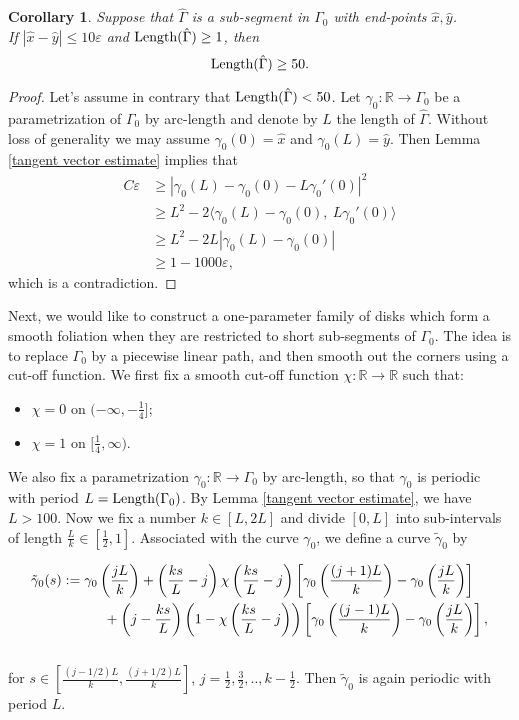 \documentclass[a4paper, reqno]{amsart}
\newtheorem{corollary}[theorem]{Corollary}
\theoremstyle{definition}
\theoremstyle{remark}
\numberwithin{equation}{section}
\newcommand{\Len}{\textup{Length}}
\numberwithin{equation}{section}
\numberwithin{equation}{section}
\begin{document}
\begin{corollary}{\label{large length}}
	Suppose that $\hat{\Gamma}$ is a sub-segment in $\Gamma_0$ with end-points $\hat{x}, \hat{y}$.\\ If $|\hat{x} - \hat{y}|\leq 10\varepsilon$ and $\Len(\hat{\Gamma})\geq 1$, then 
	\[\Len(\hat{\Gamma}) \geq 50.\]  	
\end{corollary}

\begin{proof}
	Let's assume in contrary that $\Len(\hat{\Gamma}) < 50$.  Let $\gamma_0:\mathbb{R}\to\Gamma_0$ be a parametrization of $\Gamma_0$ by arc-length and denote by $L$ the length of $\hat{\Gamma}$. Without loss of generality we may assume $\gamma_0(0) = \hat{x}$ and $\gamma_0(L) = \hat{y}$. Then Lemma \ref{tangent vector estimate} implies that 
	\begin{align*}
	C\varepsilon &\geq |\gamma_0(L) - \gamma_0(0) - L\gamma_0'(0)|^2\\
	&\geq L^2 - 2\langle \gamma_0(L) - \gamma_0(0),\ L\gamma_0'(0)\rangle\\
	&\geq L^2 - 2L |\gamma_0(L) - \gamma_0(0)|\\
	&\geq 1 -1000\varepsilon, 
	\end{align*}
	which is a contradiction.
\end{proof}

\bigskip

Next, we would like to construct a one-parameter family of disks which form a smooth foliation when they are restricted to short sub-segments of $\Gamma_0$. The idea is to replace $\Gamma_0$ by a piecewise linear path, and then smooth out the corners using a cut-off function. We first fix a smooth cut-off function $\chi:\mathbb{R}\to\mathbb{R}$ such that:
 \begin{itemize}
 	\item $\chi = 0$ on $(-\infty, -\frac{1}{4}]$;
 	\item $\chi = 1$ on $[\frac{1}{4}, \infty)$.
 \end{itemize}
 We also fix a parametrization $\gamma_0 : \mathbb{R}\to\Gamma_0$ by arc-length,  so that $\gamma_0$ is periodic with period $L = \Len(\Gamma_0)$. By Lemma \ref{tangent vector estimate}, we have $L > 100$. Now we fix a number $k\in [L, 2L]$ and divide $[0, L]$ into sub-intervals of length $\frac{L}{k}\in [\frac{1}{2}, 1]$.
Associated with the curve $\gamma_0$, we define a curve $\tilde{\gamma}_0$ by

\begin{align}{\label{smoothing}}
	\tilde{\gamma}_0(s) &:= \gamma_0\left(\frac{jL}{k}\right) + \left(\frac{ks}{L} - j\right)\chi\left(\frac{ks}{L} - j\right)\left[ \gamma_0\left(\frac{(j+1)L}{k}\right) - \gamma_0\left(\frac{jL}{k}\right)\right]\notag\\
	&\quad\quad\quad + \left( j - \frac{ks}{L} \right)\left( 1 -\chi\left(\frac{ks}{L} - j\right)\right)\left[ \gamma_0\left(\frac{(j-1)L}{k}\right) - \gamma_0\left(\frac{jL}{k}\right)\right],
\end{align}\\
for $s\in \left[\frac{(j - 1/2)L}{k}, \frac{(j + 1/2)L}{k}\right]$, $j = \frac{1}{2}, \frac{3}{2}, .., k -\frac{1}{2}$. 
Then $\tilde{\gamma}_0$ is again periodic with period $L$. 
\end{document}
